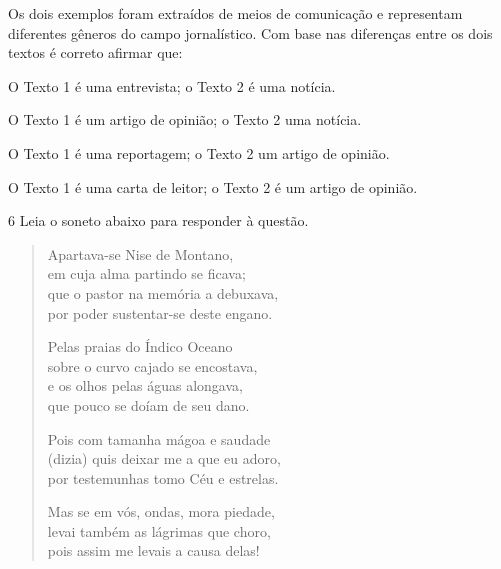 Os dois exemplos foram extraídos de meios de comunicação e representam
diferentes gêneros do campo jornalístico. Com base nas diferenças entre
os dois textos é correto afirmar que:

\begin{escolha}
    
    \item O Texto 1 é uma entrevista; o Texto 2 é uma notícia.
    
    \item O Texto 1 é um artigo de opinião; o Texto 2 uma notícia.
    
    \item O Texto 1 é uma reportagem; o Texto 2 um artigo de opinião.
    
    \item O Texto 1 é uma carta de leitor; o Texto 2 é um artigo de opinião.

\end{escolha}

\num{6} Leia o soneto abaixo para responder à questão. 

\begin{myquote}
\begin{verse}

Apartava-se Nise de Montano, \\
em cuja alma partindo se ficava; \\
que o pastor na memória a debuxava, \\
por poder sustentar-se deste engano.

Pelas praias do Índico Oceano \\
sobre o curvo cajado se encostava, \\
e os olhos pelas águas alongava, \\
que pouco se doíam de seu dano.

Pois com tamanha mágoa e saudade \\
(dizia) quis deixar me a que eu adoro, \\
por testemunhas tomo Céu e estrelas.

Mas se em vós, ondas, mora piedade, \\
levai também as lágrimas que choro, \\
pois assim me levais a causa delas!


\end{verse}

\end{myquote}

